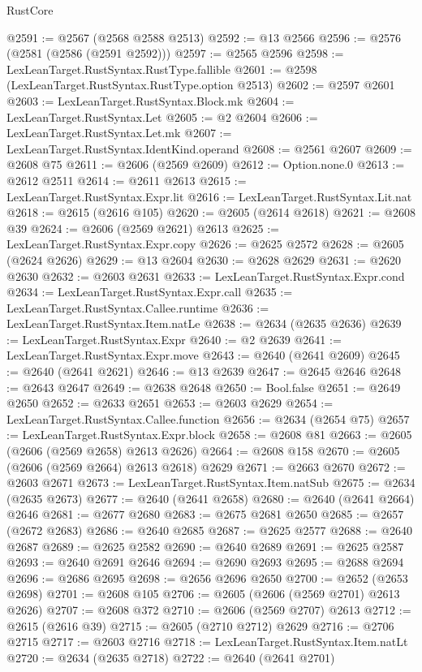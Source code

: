 \begin{lexlean}{RustCore}
\begin{coremodule}
@2591 := @2567 (@2568 @2588 @2513)
@2592 := @13 @2566
@2596 := @2576 (@2581 (@2586 (@2591 @2592)))
@2597 := @2565 @2596
@2598 := LexLeanTarget.RustSyntax.RustType.fallible
@2601 := @2598 (LexLeanTarget.RustSyntax.RustType.option @2513)
@2602 := @2597 @2601
@2603 := LexLeanTarget.RustSyntax.Block.mk
@2604 := LexLeanTarget.RustSyntax.Let
@2605 := @2 @2604
@2606 := LexLeanTarget.RustSyntax.Let.mk
@2607 := LexLeanTarget.RustSyntax.IdentKind.operand
@2608 := @2561 @2607
@2609 := @2608 @75
@2611 := @2606 (@2569 @2609)
@2612 := Option.none.{0}
@2613 := @2612 @2511
@2614 := @2611 @2613
@2615 := LexLeanTarget.RustSyntax.Expr.lit
@2616 := LexLeanTarget.RustSyntax.Lit.nat
@2618 := @2615 (@2616 @105)
@2620 := @2605 (@2614 @2618)
@2621 := @2608 @39
@2624 := @2606 (@2569 @2621) @2613
@2625 := LexLeanTarget.RustSyntax.Expr.copy
@2626 := @2625 @2572
@2628 := @2605 (@2624 @2626)
@2629 := @13 @2604
@2630 := @2628 @2629
@2631 := @2620 @2630
@2632 := @2603 @2631
@2633 := LexLeanTarget.RustSyntax.Expr.cond
@2634 := LexLeanTarget.RustSyntax.Expr.call
@2635 := LexLeanTarget.RustSyntax.Callee.runtime
@2636 := LexLeanTarget.RustSyntax.Item.natLe
@2638 := @2634 (@2635 @2636)
@2639 := LexLeanTarget.RustSyntax.Expr
@2640 := @2 @2639
@2641 := LexLeanTarget.RustSyntax.Expr.move
@2643 := @2640 (@2641 @2609)
@2645 := @2640 (@2641 @2621)
@2646 := @13 @2639
@2647 := @2645 @2646
@2648 := @2643 @2647
@2649 := @2638 @2648
@2650 := Bool.false
@2651 := @2649 @2650
@2652 := @2633 @2651
@2653 := @2603 @2629
@2654 := LexLeanTarget.RustSyntax.Callee.function
@2656 := @2634 (@2654 @75)
@2657 := LexLeanTarget.RustSyntax.Expr.block
@2658 := @2608 @81
@2663 := @2605 (@2606 (@2569 @2658) @2613 @2626)
@2664 := @2608 @158
@2670 := @2605 (@2606 (@2569 @2664) @2613 @2618) @2629
@2671 := @2663 @2670
@2672 := @2603 @2671
@2673 := LexLeanTarget.RustSyntax.Item.natSub
@2675 := @2634 (@2635 @2673)
@2677 := @2640 (@2641 @2658)
@2680 := @2640 (@2641 @2664) @2646
@2681 := @2677 @2680
@2683 := @2675 @2681 @2650
@2685 := @2657 (@2672 @2683)
@2686 := @2640 @2685
@2687 := @2625 @2577
@2688 := @2640 @2687
@2689 := @2625 @2582
@2690 := @2640 @2689
@2691 := @2625 @2587
@2693 := @2640 @2691 @2646
@2694 := @2690 @2693
@2695 := @2688 @2694
@2696 := @2686 @2695
@2698 := @2656 @2696 @2650
@2700 := @2652 (@2653 @2698)
@2701 := @2608 @105
@2706 := @2605 (@2606 (@2569 @2701) @2613 @2626)
@2707 := @2608 @372
@2710 := @2606 (@2569 @2707) @2613
@2712 := @2615 (@2616 @39)
@2715 := @2605 (@2710 @2712) @2629
@2716 := @2706 @2715
@2717 := @2603 @2716
@2718 := LexLeanTarget.RustSyntax.Item.natLt
@2720 := @2634 (@2635 @2718)
@2722 := @2640 (@2641 @2701)

\end{coremodule}
\end{lexlean}
